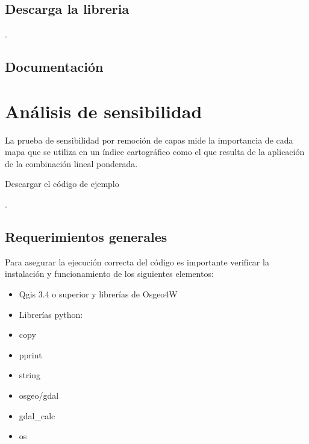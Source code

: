 \documentclass[letterpaper,10pt,spanish]{sphinxmanual}
\begin{document}
\section{Descarga la libreria}
\label{\detokenize{apcsig:descarga-la-libreria}}
.


\section{Documentación}
\label{\detokenize{apcsig:documentacion}}

\chapter{Análisis de sensibilidad}
\label{\detokenize{analisis:analisis-de-sensibilidad}}\label{\detokenize{analisis::doc}}
La prueba de sensibilidad por remoción de capas mide la importancia de cada mapa que se utiliza en un índice cartográfico como el que resulta de la aplicación de la combinación lineal ponderada.

Descargar el código de ejemplo

.


\section{Requerimientos generales}
\label{\detokenize{analisis:requerimientos-generales}}
Para asegurar la ejecución correcta del código es importante
verificar la instalación y funcionamiento de los siguientes elementos:
\begin{itemize}
\item {} 
Qgis 3.4 o superior y librerías de Osgeo4W

\item {} 
Librerías python:

\end{itemize}
\begin{itemize}
\item {} 
copy

\item {} 
pprint

\item {} 
string

\item {} 
osgeo/gdal

\item {} 
gdal\_calc

\item {} 
os

\end{itemize}
\end{document}
